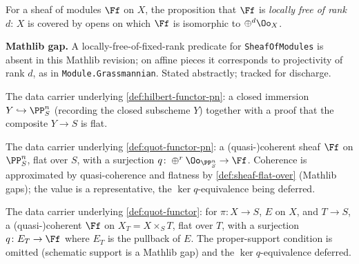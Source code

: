 \begin{definition}
  \label{def:is-locally-free-of-rank}
  For a sheaf of modules $\Ff$ on $X$, the proposition that $\Ff$ is
  \emph{locally free of rank $d$}: $X$ is covered by opens on which $\Ff$ is
  isomorphic to $\oplus^d\Oo_X$.

  \textbf{Mathlib gap.} A locally-free-of-fixed-rank predicate for
  \texttt{SheafOfModules} is absent in this Mathlib revision; on affine pieces it
  corresponds to projectivity of rank $d$, as in \texttt{Module.Grassmannian}.
  Stated abstractly; tracked for discharge.
\end{definition}

\begin{definition}
  \label{def:hilbert-family-pn}
  The data carrier underlying \cref{def:hilbert-functor-pn}: a closed immersion
  $Y\hookrightarrow\PP^n_S$ (recording the closed subscheme $Y$) together with a
  proof that the composite $Y\to S$ is flat.
\end{definition}

\begin{definition}
  \label{def:quot-family-pn}
  The data carrier underlying \cref{def:quot-functor-pn}: a (quasi-)coherent
  sheaf $\Ff$ on $\PP^n_S$, flat over $S$, with a surjection
  $q\colon\oplus^r\Oo_{\PP^n_S}\to\Ff$. Coherence is approximated by
  quasi-coherence and flatness by \cref{def:sheaf-flat-over} (Mathlib gaps); the
  value is a representative, the $\ker q$-equivalence being deferred.
\end{definition}

\begin{definition}
  \label{def:quot-family}
  The data carrier underlying \cref{def:quot-functor}: for $\pi\colon X\to S$,
  $E$ on $X$, and $T\to S$, a (quasi-)coherent $\Ff$ on $X_T=X\times_S T$, flat
  over $T$, with a surjection $q\colon E_T\to\Ff$ where $E_T$ is the pullback of
  $E$. The proper-support condition is omitted (schematic support is a Mathlib
  gap) and the $\ker q$-equivalence deferred.
\end{definition}

